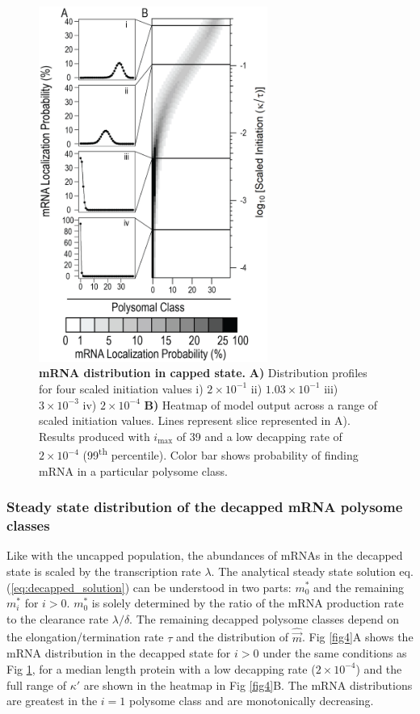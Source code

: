 \documentclass[10pt,letterpaper]{article}
\newcommand{\imax}{\ensuremath{{i_{\max}}}\xspace}
\newcommand{\mvec}{\ensuremath{\vec{m}}\xspace}
\newcommand{\mvechat}{\ensuremath{\hat{\mvec}}\xspace}
\begin{document}
\begin{figure}[!h]
  \begin{center}
    \includegraphics[width=75mm]{Images/2023-07-04_Unmarked_slices.png}
    \caption{{\bf mRNA distribution in capped state.} {\bf A)} Distribution profiles for four scaled initiation values i) $2\times 10^{-1}$ ii) $1.03\times 10^{-1}$ iii) $3\times 10^{-3}$ iv) $2\times 10^{-4}$ {\bf B)} Heatmap of model output across a range of scaled initiation values.
      Lines represent slice represented in A).
      Results produced with \imax of 39 and a low decapping rate of $2\times10^{-4}$  (99\textsuperscript{th} percentile).
      Color bar shows probability of finding mRNA in a particular polysome class.}
    \label{fig3}
  \end{center}
\end{figure}


\subsubsection*{Steady state distribution of the decapped mRNA polysome classes}
Like with the uncapped population, the abundances of mRNAs in the decapped state \mvechatstart is scaled by the transcription rate $\lambda$.
The analytical steady state solution eq. (\ref{eq:decapped_solution}) can be understood in two parts: $m_0^*$ and the remaining $m_i^*$ for $i>0$.
$m_0^*$ is solely determined by the ratio of the mRNA production rate to the clearance rate $\lambda / \delta$.
The remaining decapped polysome classes depend on the elongation/termination rate $\tau$ and the distribution of \mvechat.
Fig \ref{fig4}A shows the mRNA distribution in the decapped state for $i>0$ under the same conditions as Fig \ref{fig3}, for a median length protein with a low decapping rate ($2\times10^{-4}$) and the full range of $\kappa'$ are shown in the heatmap in Fig \ref{fig4}B.
The mRNA distributions are greatest in the $i=1$ polysome class and are monotonically decreasing. 
\end{document}
